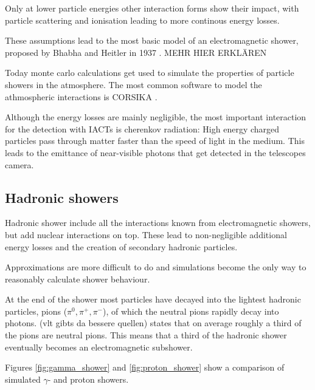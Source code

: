 Only at lower particle energies other interaction forms show their impact,
with particle scattering and ionisation 
leading to more continous energy losses.

These assumptions lead to the most basic model of an 
electromagnetic shower, proposed by Bhabha and Heitler in 1937
\cite{doi:10.1098/rspa.1937.0082}.
MEHR HIER ERKLÄREN


Today monte carlo calculations get used to simulate the properties 
of particle showers in the atmosphere.
The most common software to model the athmospheric interactions is
CORSIKA \cite{Engel:2018akg}.

Although the energy losses are mainly negligible, 
the most important interaction for the detection with IACTs is 
cherenkov radiation: High energy charged particles pass through 
matter faster than the speed of light in the medium. This leads
to the emittance of near-visible photons that get detected 
in the telescopes camera. 


\subsection{Hadronic showers}
Hadronic shower include all the interactions known from 
electromagnetic showers, but add nuclear interactions on top.
These lead to non-negligible additional energy losses 
and the creation of secondary hadronic particles.

Approximations are more difficult to do and simulations 
become the only way to reasonably calculate shower behaviour.

At the end of the shower most particles have decayed into the 
lightest hadronic particles, pions ($\pi^0, \pi^+, \pi^-$), of which the neutral pions 
rapidly decay into photons.
\cite{bookap} (vlt gibts da bessere quellen) states that on average
roughly a third of the pions are neutral pions. This means that 
a third of the hadronic shower eventually becomes an electromagnetic
subshower.

Figures \ref{fig:gamma_shower} and \ref{fig:proton_shower}
show a comparison of simulated 
$\gamma$- and proton showers.

